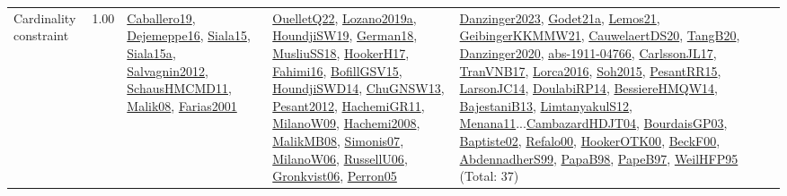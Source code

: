{\begin{longtable}{p{3cm}r>{\raggedright\arraybackslash}p{6cm}>{\raggedright\arraybackslash}p{6cm}>{\raggedright\arraybackslash}p{8cm}}
\index{Cardinality constraint}\index{Constraints!Cardinality constraint}Cardinality constraint &  1.00 & \hyperref[detail:Caballero19]{Caballero19}, \hyperref[detail:Dejemeppe16]{Dejemeppe16}, \hyperref[detail:Siala15]{Siala15}, \hyperref[detail:Siala15a]{Siala15a}, \hyperref[detail:Salvagnin2012]{Salvagnin2012}, \hyperref[detail:SchausHMCMD11]{SchausHMCMD11}, \hyperref[detail:Malik08]{Malik08}, \hyperref[detail:Farias2001]{Farias2001} & \hyperref[detail:OuelletQ22]{OuelletQ22}, \hyperref[detail:Lozano2019a]{Lozano2019a}, \hyperref[detail:HoundjiSW19]{HoundjiSW19}, \hyperref[detail:German18]{German18}, \hyperref[detail:MusliuSS18]{MusliuSS18}, \hyperref[detail:HookerH17]{HookerH17}, \hyperref[detail:Fahimi16]{Fahimi16}, \hyperref[detail:BofillGSV15]{BofillGSV15}, \hyperref[detail:HoundjiSWD14]{HoundjiSWD14}, \hyperref[detail:ChuGNSW13]{ChuGNSW13}, \hyperref[detail:Pesant2012]{Pesant2012}, \hyperref[detail:HachemiGR11]{HachemiGR11}, \hyperref[detail:MilanoW09]{MilanoW09}, \hyperref[detail:Hachemi2008]{Hachemi2008}, \hyperref[detail:MalikMB08]{MalikMB08}, \hyperref[detail:Simonis07]{Simonis07}, \hyperref[detail:MilanoW06]{MilanoW06}, \hyperref[detail:RussellU06]{RussellU06}, \hyperref[detail:Gronkvist06]{Gronkvist06}, \hyperref[detail:Perron05]{Perron05} & \hyperref[detail:Danzinger2023]{Danzinger2023}, \hyperref[detail:Godet21a]{Godet21a}, \hyperref[detail:Lemos21]{Lemos21}, \hyperref[detail:GeibingerKKMMW21]{GeibingerKKMMW21}, \hyperref[detail:CauwelaertDS20]{CauwelaertDS20}, \hyperref[detail:TangB20]{TangB20}, \hyperref[detail:Danzinger2020]{Danzinger2020}, \hyperref[detail:abs-1911-04766]{abs-1911-04766}, \hyperref[detail:CarlssonJL17]{CarlssonJL17}, \hyperref[detail:TranVNB17]{TranVNB17}, \hyperref[detail:Lorca2016]{Lorca2016}, \hyperref[detail:Soh2015]{Soh2015}, \hyperref[detail:PesantRR15]{PesantRR15}, \hyperref[detail:LarsonJC14]{LarsonJC14}, \hyperref[detail:DoulabiRP14]{DoulabiRP14}, \hyperref[detail:BessiereHMQW14]{BessiereHMQW14}, \hyperref[detail:BajestaniB13]{BajestaniB13}, \hyperref[detail:LimtanyakulS12]{LimtanyakulS12}, \hyperref[detail:Menana11]{Menana11}...\hyperref[detail:CambazardHDJT04]{CambazardHDJT04}, \hyperref[detail:BourdaisGP03]{BourdaisGP03}, \hyperref[detail:Baptiste02]{Baptiste02}, \hyperref[detail:Refalo00]{Refalo00}, \hyperref[detail:HookerOTK00]{HookerOTK00}, \hyperref[detail:BeckF00]{BeckF00}, \hyperref[detail:AbdennadherS99]{AbdennadherS99}, \hyperref[detail:PapaB98]{PapaB98}, \hyperref[detail:PapeB97]{PapeB97}, \hyperref[detail:WeilHFP95]{WeilHFP95} (Total: 37)\\

\end{longtable}}
